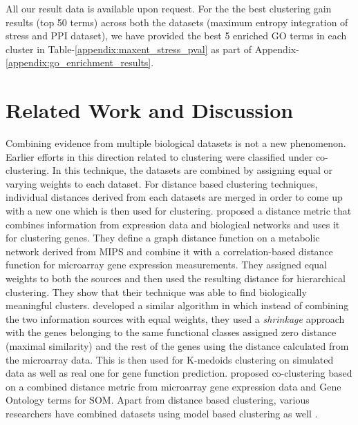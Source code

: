 All our result data is available upon request. For the the best clustering gain results (top 50 terms) across both the datasets (maximum entropy integration of stress and PPI dataset), we have provided the best 5 enriched GO terms in each cluster in Table-\ref{appendix:maxent_stress_pval} as part of Appendix-\ref{appendix:go_enrichment_results}. 
\section{Related Work and Discussion}

Combining evidence from multiple biological datasets is not a new phenomenon. Earlier efforts in this direction related to clustering were classified under co-clustering. In this technique, the datasets are combined by assigning equal or varying weights to each dataset. For distance based clustering techniques, individual distances derived from each datasets are merged in order to come up with a new one which is then used for clustering. \citet{Hanisch2002Coclustering} proposed a distance metric that combines information from expression data and biological networks and uses it for clustering genes. They define a graph distance function on a metabolic network derived from MIPS \citep{Gueldener2006MPact} and combine it with a correlation-based distance function for microarray gene expression measurements. They assigned equal weights to both the sources and then used the resulting distance for hierarchical clustering. They show that their technique was able to find biologically meaningful clusters. \citet{huang2006incorporating} developed a similar algorithm in which instead of combining the two information sources with equal weights, they used a \textit{shrinkage} approach with the genes belonging to the same functional classes assigned zero distance (maximal similarity) and the rest of the genes using the distance calculated from the microarray data. This is then used for K-medoids clustering on simulated data as well as real one for gene function prediction. \citet{bramier2007coclustering} proposed co-clustering based on a combined distance metric from microarray gene expression data and Gene Ontology terms for \ac{SOM}. Apart from distance based clustering, various researchers have combined datasets using model based clustering as well \citep{pan06incorporating}.

